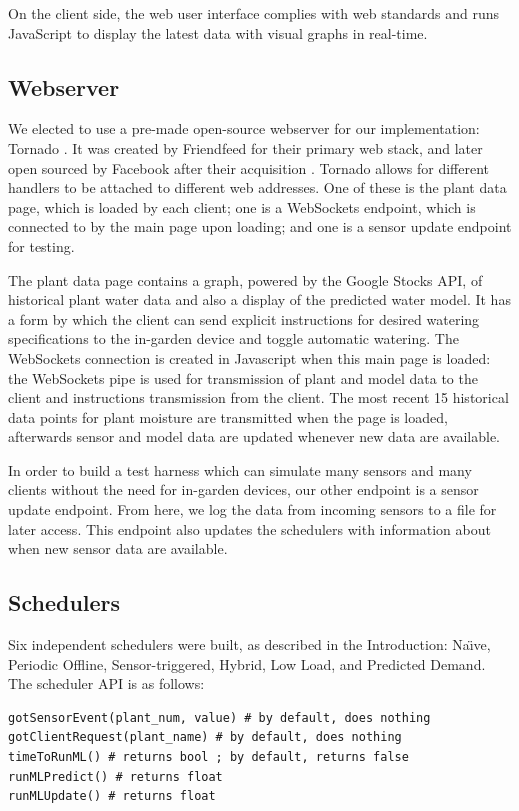 \documentclass[a4paper]{acm_proc_article-sp}
\begin{document}
On the client side, the web user interface complies with web standards and runs JavaScript to display the latest data with visual graphs in real-time.

\subsection{Webserver}

We elected to use a pre-made open-source webserver for our implementation: Tornado \cite{}.  It was created by Friendfeed for their primary web stack, and later open sourced by Facebook after their acquisition \cite{}.  Tornado allows for different handlers to be attached to different web addresses.  One of these is the plant data page, which is loaded by each client; one is a WebSockets endpoint, which is connected to by the main page upon loading; and one is a sensor update endpoint for testing.

The plant data page contains a graph, powered by the Google Stocks API, of historical plant water data and also a display of the predicted water model.  It has a form by which the client can send explicit instructions for desired watering specifications to the in-garden device and toggle automatic watering.  The WebSockets connection is created in Javascript when this main page is loaded: the WebSockets pipe is used for transmission of plant and model data to the client and instructions transmission from the client.  The most recent 15 historical data points for plant moisture are transmitted when the page is loaded, afterwards sensor and model data are updated whenever new data are available.

In order to build a test harness which can simulate many sensors and many clients without the need for in-garden devices, our other endpoint is a sensor update endpoint.  From here, we log the data from incoming sensors to a file for later access.  This endpoint also updates the schedulers with information about when new sensor data are available.

\subsection{Schedulers}

Six independent schedulers were built, as described in the Introduction: Na\"{\i}ve, Periodic Offline, Sensor-triggered, Hybrid, Low Load, and Predicted Demand.  The scheduler API is as follows:

\begin{lstlisting}
gotSensorEvent(plant_num, value) # by default, does nothing
gotClientRequest(plant_name) # by default, does nothing
timeToRunML() # returns bool ; by default, returns false
runMLPredict() # returns float
runMLUpdate() # returns float
\end{lstlisting}
\end{document}
